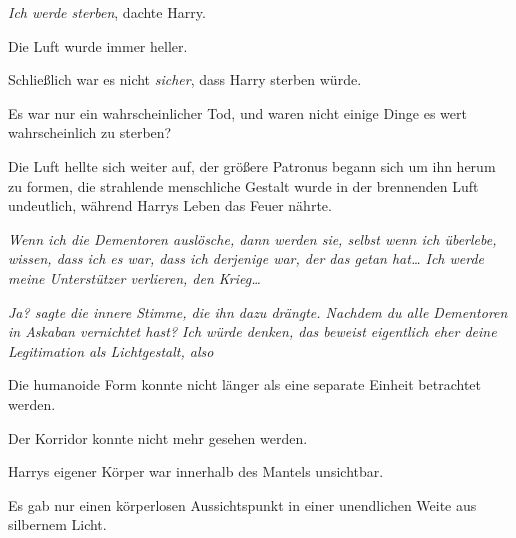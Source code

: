 \emph{Ich werde sterben}, dachte Harry.

Die Luft wurde immer heller.

Schließlich war es nicht \emph{sicher}, dass Harry sterben würde.

Es war nur ein wahrscheinlicher Tod, und waren nicht einige Dinge es wert wahrscheinlich zu sterben?

Die Luft hellte sich weiter auf, der größere Patronus begann sich um ihn herum zu formen, die strahlende menschliche Gestalt wurde in der brennenden Luft undeutlich, während Harrys Leben das Feuer nährte.

\emph{Wenn ich die Dementoren auslösche, dann werden sie, selbst wenn ich überlebe, wissen, dass ich es war, dass ich derjenige war, der das getan hat… Ich werde meine Unterstützer verlieren, den Krieg…}

\emph{\emph{Ja?} sagte die innere Stimme, die ihn dazu drängte. \emph{Nachdem du alle Dementoren in Askaban vernichtet hast? Ich würde denken, das beweist eigentlich eher deine Legitimation als Lichtgestalt, also } }

Die humanoide Form konnte nicht länger als eine separate Einheit betrachtet werden.

Der Korridor konnte nicht mehr gesehen werden.

Harrys eigener Körper war innerhalb des Mantels unsichtbar.

Es gab nur einen körperlosen Aussichtspunkt in einer unendlichen Weite aus silbernem Licht.

